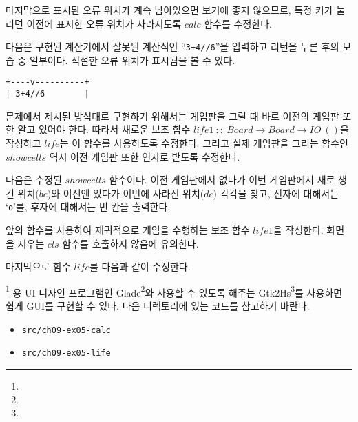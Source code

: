 마지막으로 표시된 오류 위치가 계속 남아있으면 보기에 좋지 않으므로, 특정 키가
눌리면 이전에 표시한 오류 위치가 사라지도록 $calc$ 함수를 수정한다.


다음은 구현된 계산기에서 잘못된 계산식인 ``\texttt{3+4//6}''을 입력하고 리턴을
누른 후의 모습 중 일부이다. 적절한 오류 위치가 표시됨을 볼 수 있다.

\begin{lstlisting}
+----v----------+
| 3+4//6        |
\end{lstlisting}


문제에서 제시된 방식대로 구현하기 위해서는 게임판을 그릴 때 바로 이전의
게임판 또한 알고 있어야 한다. 따라서 새로운 보조 함수 $life1~::~Board
\rightarrow Board \rightarrow IO~()$을 작성하고 $life$는 이 함수를 사용하도록
수정한다. 그리고 실제 게임판을 그리는 함수인 $showcells$ 역시 이전 게임판 또한
인자로 받도록 수정한다.

다음은 수정된 $showcells$ 함수이다. 이전 게임판에서 없다가 이번 게임판에서
새로 생긴 위치($bc$)와 이전엔 있다가 이번에 사라진 위치($dc$) 각각을 찾고,
전자에 대해서는 `\texttt{o}'를, 후자에 대해서는 빈 칸을 출력한다.


앞의 함수를 사용하여 재귀적으로 게임을 수행하는 보조 함수 $life1$을
작성한다. 화면을 지우는 $cls$ 함수를 호출하지 않음에 유의한다.


마지막으로 함수 $life$를 다음과 같이 수정한다.




\GTK\footnote{} 용 UI 디자인 프로그램인
\textsf{Glade}\footnote{}와  
사용할 수 있도록 해주는
\textsf{Gtk2Hs}\footnote{}를 사용하면
쉽게 GUI를 구현할 수 있다. 다음 디렉토리에 있는 코드를 참고하기 바란다.

\begin{itemize}
\item \texttt{src/ch09-ex05-calc}
\item \texttt{src/ch09-ex05-life}
\end{itemize}


